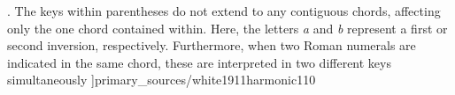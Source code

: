 \phdfigure[Notation for key fluctuations, in parentheses,
appearing in \textcite[p.~110]{white1911harmonic}. The keys
within parentheses do not extend to any contiguous chords,
affecting only the one chord contained within. Here, the
letters \emph{a} and \emph{b} represent a first or second
inversion, respectively. Furthermore, when two Roman
numerals are indicated in the same chord, these are
interpreted in two different keys simultaneously
]{primary_sources/white1911harmonic110}









